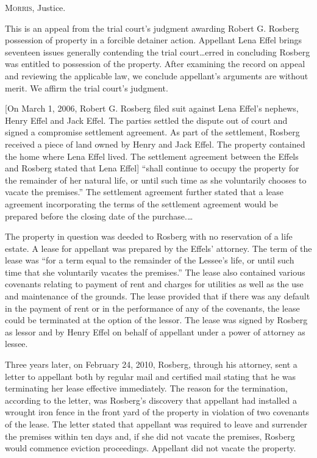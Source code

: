 
\opinion \textsc{Morris}, Justice.

This is an appeal from the trial court's judgment awarding Robert G. Rosberg
possession of property in a forcible detainer action. Appellant Lena Effel
brings seventeen issues generally contending the trial court\ldots  erred in
concluding Rosberg was entitled to possession of the property. After examining
the record on appeal and reviewing the applicable law, we conclude appellant's
arguments are without merit. We affirm the trial court's judgment.


[On March 1, 2006, Robert G. Rosberg filed suit against Lena Effel's nephews,
Henry Effel and Jack Effel. The parties settled the dispute out of court and
signed a compromise settlement agreement. As part of the settlement, Rosberg
received a piece of land owned by Henry and Jack Effel.  The property contained
the home where Lena Effel lived. The settlement agreement between the Effels
and Rosberg stated that Lena Effel] ``shall continue to occupy the property for
the remainder of her natural life, or until such time as she voluntarily
chooses to vacate the premises.'' The settlement agreement further stated that
a lease agreement incorporating the terms of the settlement agreement would be
prepared before the closing date of the purchase.\ldots

The property in question was deeded to Rosberg with no reservation of a life
estate. A lease for appellant was prepared by the Effels' attorney. The term of
the lease was ``for a term equal to the remainder of the Lessee's life, or
until such time that she voluntarily vacates the premises.'' The lease also
contained various covenants relating to payment of rent and charges for
utilities as well as the use and maintenance of the grounds. The lease provided
that if there was any default in the payment of rent or in the performance of
any of the covenants, the lease could be terminated at the option of the
lessor. The lease was signed by Rosberg as lessor and by Henry Effel on behalf
of appellant under a power of attorney as lessee.

Three years later, on February 24, 2010, Rosberg, through his attorney, sent a
letter to appellant both by regular mail and certified mail stating that he was
terminating her lease effective immediately. The reason for the termination,
according to the letter, was Rosberg's discovery that appellant had installed a
wrought iron fence in the front yard of the property in violation of two
covenants of the lease. The letter stated that appellant was required to leave
and surrender the premises within ten days and, if she did not vacate the
premises, Rosberg would commence eviction proceedings. Appellant did not vacate
the property.

